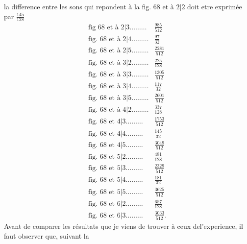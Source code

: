 \documentclass[11pt,a4paper]{article}
\begin{document}

la difference entre les sons qui repondent
à la fig. 68 et à $2|2$ doit etre exprimée par $\frac{145}{128}$
\[ \begin{array}{ll}
\text{fig 68 et à } 2|3 \ldots\ldots\ldots & \frac{985}{512} \\[4pt]
\text{fig. 68 et à } 2|4 \ldots\ldots\ldots & \frac{97}{32} \\[4pt]
\text{fig. 68 et à } 2|5 \ldots\ldots\ldots & \frac{2281}{512} \\[4pt]
\text{fig. 68 et à } 3|2 \ldots\ldots\ldots & \frac{225}{128} \\[4pt]
\text{fig. 68 et à } 3|3 \ldots\ldots\ldots & \frac{1305}{512} \\[4pt]
\text{fig. 68 et à } 3|4 \ldots\ldots\ldots & \frac{117}{32} \\[4pt]
\text{fig. 68 et à } 3|5 \ldots\ldots\ldots & \frac{2601}{512} \\[4pt]
\text{fig. 68 et à } 4|2 \ldots\ldots\ldots & \frac{337}{128} \\[4pt]
\text{fig. 68 et } 4|3 \ldots\ldots\ldots & \frac{1753}{512} \\[4pt]
\text{fig. 68 et } 4|4 \ldots\ldots\ldots & \frac{145}{32} \\[4pt]
\text{fig. 68 et } 4|5 \ldots\ldots\ldots & \frac{3049}{512} \\[4pt]
\text{fig. 68 et } 5|2 \ldots\ldots\ldots & \frac{481}{128} \\[4pt]
\text{fig. 68 et } 5|3 \ldots\ldots\ldots & \frac{2329}{512} \\[4pt]
\text{fig. 68 et } 5|4 \ldots\ldots\ldots & \frac{181}{32} \\[4pt]
\text{fig. 68 et } 5|5 \ldots\ldots\ldots & \frac{3625}{512} \\[4pt]
\text{fig. 68 et } 6|2 \ldots\ldots\ldots & \frac{657}{128} \\[4pt]
\text{fig. 68 et } 6|3 \ldots\ldots\ldots & \frac{3033}{512}.
\end{array} \]
Avant de comparer les résultats que je viens de trouver
à ceux del'experience, il faut observer que, suivant la
\end{document}
